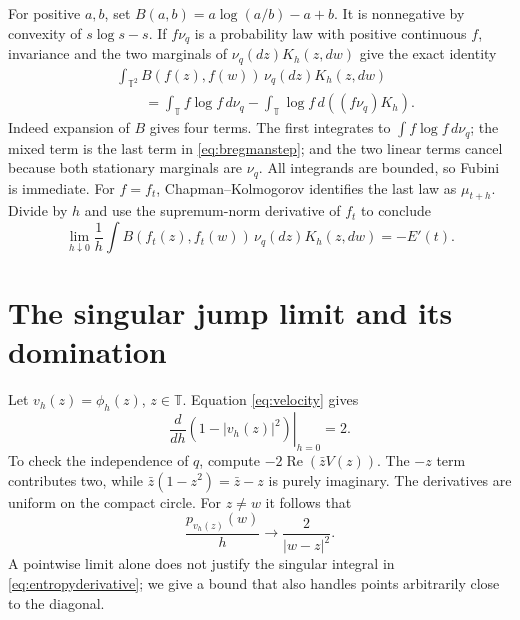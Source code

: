 \documentclass[11pt]{article}
\newcommand{\T}{\mathbb T}\newcommand{\D}{\mathbb D}
\begin{document}
For positive $a,b$, set $B(a,b)=a\log(a/b)-a+b$.
It is nonnegative by convexity of $s\log s-s$.
If $f\nu_q$ is a probability law with positive continuous
$f$, invariance and the two marginals of
$\nu_q(dz)K_h(z,dw)$ give the exact identity
\begin{equation}\label{eq:bregmanstep}
\begin{split}
 &\int_{\T^2}B(f(z),f(w))\,\nu_q(dz)K_h(z,dw)\\
 &\qquad=\int_\T f\log f\,d\nu_q
        -\int_\T\log f\,d((f\nu_q)K_h).
\end{split}
\end{equation}
Indeed expansion of $B$ gives four terms. The first
integrates to $\int f\log f\,d\nu_q$; the mixed term
is the last term in \eqref{eq:bregmanstep}; and the two
linear terms cancel because both stationary marginals
are $\nu_q$. All integrands are bounded, so Fubini is
immediate.
For $f=f_t$, Chapman--Kolmogorov identifies the last
law as $\mu_{t+h}$. Divide by $h$ and use the
supremum-norm derivative of $f_t$ to conclude
\begin{equation}\label{eq:steplimit}
 \lim_{h\downarrow0}\frac1h
 \int B(f_t(z),f_t(w))\,\nu_q(dz)K_h(z,dw)=-E'(t).
\end{equation}

\section{The singular jump limit and its domination}
Let $v_h(z)=\phi_h(z)$, $z\in\T$.
Equation \eqref{eq:velocity} gives
\begin{equation}\label{eq:radial}
 \left.\frac{d}{dh}(1-|v_h(z)|^2)\right|_{h=0}=2.
\end{equation}
To check the independence of $q$, compute
$-2\operatorname{Re}(\bar z V(z))$.
The $-z$ term contributes two, while
$\bar z(1-z^2)=\bar z-z$ is purely imaginary.
The derivatives are uniform on the compact circle.
For $z\ne w$ it follows that
\begin{equation}\label{eq:jump}
 \frac{p_{v_h(z)}(w)}h\longrightarrow\frac2{|w-z|^2}.
\end{equation}
A pointwise limit alone does not justify the singular
integral in \eqref{eq:entropyderivative}; we give a
bound that also handles points arbitrarily close to the diagonal.
\end{document}
